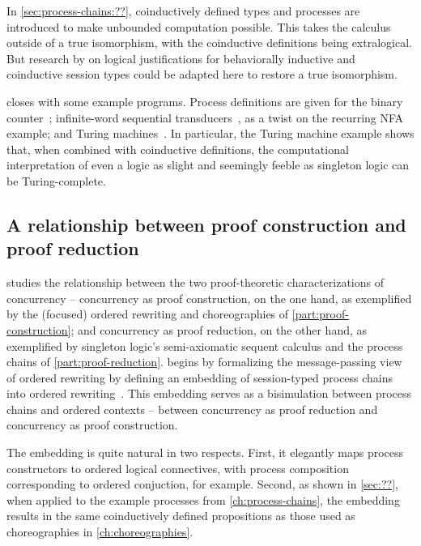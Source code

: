 In \cref{sec:process-chains:??}, coinductively defined types and processes are introduced to make unbounded computation possible.
This takes the calculus outside of a true isomorphism, with the coinductive definitions being extralogical.
But research by \textcites{Derakhshan+Pfenning:LMCS20}{Somayyajula+Pfenning:20} on logical justifications for behaviorally inductive and coinductive session types could be adapted here to restore a true isomorphism.

 closes with some example programs.
Process definitions are given for the binary counter~; infinite-word sequential transducers~, as a twist on the recurring \acs*{NFA} example; and Turing machines~.
In particular, the Turing machine example shows that, when combined with coinductive definitions, the computational interpretation of even a logic as slight and seemingly feeble as singleton logic can be Turing-complete.

\subsection{A relationship between proof construction and proof reduction}

 studies the relationship between the two proof-theoretic characterizations of concurrency -- concurrency as proof construction, on the one hand, as exemplified by the (focused) ordered rewriting and choreographies of \cref{part:proof-construction}; and concurrency as proof reduction, on the other hand, as exemplified by singleton logic's semi-axiomatic sequent calculus and the process chains of \cref{part:proof-reduction}.
 begins by formalizing the message-passing view of ordered rewriting by defining an embedding of session-typed process chains into ordered rewriting~.
This embedding serves as a bisimulation between process chains and ordered contexts -- between concurrency as proof reduction and concurrency as proof construction.

The embedding is quite natural in two respects.  
First, it elegantly maps process constructors to ordered logical connectives, with process composition corresponding to ordered conjuction, for example.
Second, as shown in \cref{sec:??}, when applied to the example processes from \cref{ch:process-chains}, the embedding results in the same coinductively defined propositions as those used as choreographies in \cref{ch:choreographies}.

